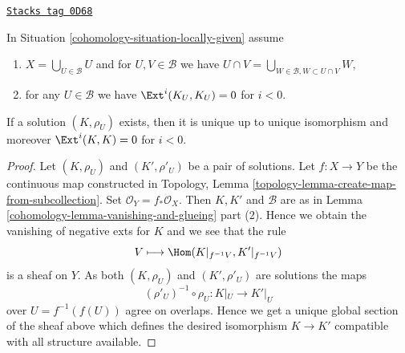 \begin{lemma}[Uniqueness]
\label{cohomology-lemma-uniqueness}
\href{https://stacks.math.columbia.edu/tag/0D68}{\texttt{Stacks tag 0D68}}

In Situation \ref{cohomology-situation-locally-given} assume
\begin{enumerate}
\item $X = \bigcup_{U \in \mathcal{B}} U$ and
for $U, V \in \mathcal{B}$ we have
$U \cap V = \bigcup_{W \in \mathcal{B}, W \subset U \cap V} W$,
\item for any $U \in \mathcal{B}$ we have $\Ext^i(K_U, K_U) = 0$
for $i < 0$.
\end{enumerate}
If a solution $(K, \rho_U)$ exists, then it is unique up to unique isomorphism
and moreover $\Ext^i(K, K) = 0$ for $i < 0$.
\end{lemma}

\begin{proof}

Let $(K, \rho_U)$ and $(K', \rho'_U)$ be a pair of solutions.
Let $f : X \to Y$ be the continuous map constructed
in Topology, Lemma \ref{topology-lemma-create-map-from-subcollection}.
Set $\mathcal{O}_Y = f_*\mathcal{O}_X$.
Then $K, K'$ and $\mathcal{B}$ are as in
Lemma \ref{cohomology-lemma-vanishing-and-glueing} part (2).
Hence we obtain the vanishing of negative exts for $K$ and we see that
the rule
$$
V \longmapsto \Hom(K|_{f^{-1}V}, K'|_{f^{-1}V})
$$
is a sheaf on $Y$. As both $(K, \rho_U)$ and $(K', \rho'_U)$ are solutions
the maps
$$
(\rho'_U)^{-1} \circ \rho_U : K|_U \longrightarrow K'|_U
$$
over $U = f^{-1}(f(U))$ agree on overlaps. Hence we get a unique global
section of the sheaf above which defines the desired isomorphism
$K \to K'$ compatible with all structure available.
\end{proof}

